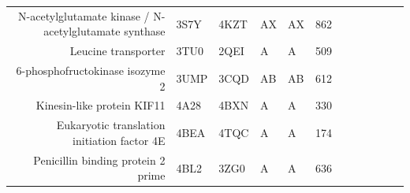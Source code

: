 \begin{table}
\begin{scriptsize}
\begin{tabular}{rrrrrrrrrrrr}
\multicolumn{1}{r}{N-acetylglutamate kinase / N-acetylglutamate synthase} & \multicolumn{1}{l}{3S7Y} & \multicolumn{1}{l}{4KZT} & \multicolumn{1}{l}{AX} & \multicolumn{1}{l}{AX} & 862   & \cellcolor[rgb]{ 1,  .494,  .475}  & \cellcolor[rgb]{ 1,  .494,  .475}  & \cellcolor[rgb]{ .573,  .816,  .314}  & \cellcolor[rgb]{ 1,  .494,  .475}  & \cellcolor[rgb]{ 1,  .494,  .475}  & \cellcolor[rgb]{ 1,  .494,  .475}  \\
\multicolumn{1}{r}{Leucine transporter} & \multicolumn{1}{l}{3TU0} & \multicolumn{1}{l}{2QEI} & \multicolumn{1}{l}{A} & \multicolumn{1}{l}{A} & 509   & \cellcolor[rgb]{ .573,  .816,  .314}  & \cellcolor[rgb]{ .573,  .816,  .314}  & \cellcolor[rgb]{ 1,  .494,  .475}  & \cellcolor[rgb]{ .573,  .816,  .314}  & \cellcolor[rgb]{ .573,  .816,  .314}  & \cellcolor[rgb]{ .573,  .816,  .314}  \\
\multicolumn{1}{r}{6-phosphofructokinase isozyme 2} & \multicolumn{1}{l}{3UMP} & \multicolumn{1}{l}{3CQD} & \multicolumn{1}{l}{AB} & \multicolumn{1}{l}{AB} & 612   & \cellcolor[rgb]{ .573,  .816,  .314}  & \cellcolor[rgb]{ .573,  .816,  .314}  & \cellcolor[rgb]{ .573,  .816,  .314}  & \cellcolor[rgb]{ 1,  .494,  .475}  & \cellcolor[rgb]{ .573,  .816,  .314}  & \cellcolor[rgb]{ 1,  .494,  .475}  \\
\multicolumn{1}{r}{Kinesin-like protein KIF11} & \multicolumn{1}{l}{4A28} & \multicolumn{1}{l}{4BXN} & \multicolumn{1}{l}{A} & \multicolumn{1}{l}{A} & 330   & \cellcolor[rgb]{ .573,  .816,  .314}  & \cellcolor[rgb]{ .573,  .816,  .314}  & \cellcolor[rgb]{ .573,  .816,  .314}  & \cellcolor[rgb]{ .573,  .816,  .314}  & \cellcolor[rgb]{ .573,  .816,  .314}  & \cellcolor[rgb]{ .573,  .816,  .314}  \\
\multicolumn{1}{r}{Eukaryotic translation initiation factor 4E} & \multicolumn{1}{l}{4BEA} & \multicolumn{1}{l}{4TQC} & \multicolumn{1}{l}{A} & \multicolumn{1}{l}{A} & 174   & \cellcolor[rgb]{ 1,  .494,  .475}  & \cellcolor[rgb]{ 1,  .494,  .475}  & \cellcolor[rgb]{ 1,  1,  0}  & \cellcolor[rgb]{ 1,  .494,  .475}  & \cellcolor[rgb]{ 1,  .494,  .475}  & \cellcolor[rgb]{ 1,  .494,  .475}  \\
\multicolumn{1}{r}{Penicillin binding protein 2 prime} & \multicolumn{1}{l}{4BL2} & \multicolumn{1}{l}{3ZG0} & \multicolumn{1}{l}{A} & \multicolumn{1}{l}{A} & 636   & \cellcolor[rgb]{ 1,  .494,  .475}  & \cellcolor[rgb]{ .573,  .816,  .314}  & \cellcolor[rgb]{ 1,  .494,  .475}  & \cellcolor[rgb]{ 1,  .494,  .475}  & \cellcolor[rgb]{ 1,  .494,  .475}  & \cellcolor[rgb]{ 1,  .494,  .475}  \\

\end{tabular}
\end{scriptsize}
\end{table}
